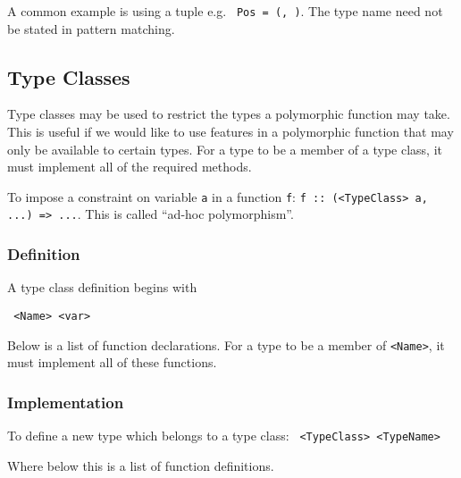 A common example is using a tuple e.g. \texttt{ Pos = (, )}. The type name need not be stated in pattern matching.

\subsection{Type Classes}
Type classes may be used to restrict the types a polymorphic function may take. This is useful if we would like to use features in a polymorphic function that may only be available to certain types. For a type to be a member of a type class, it must implement all of the required methods.

To impose a constraint on variable \texttt{a} in a function \texttt{f}: \texttt{f :: (\texttt<TypeClass> a, ...) => ...}. This is called ``ad-hoc polymorphism''.

\subsubsection{Definition}
A type class definition begins with

\texttt{ <Name> <var> }

Below is a list of function declarations. For a type to be a member of \texttt{<Name>}, it must implement all of these functions.

\subsubsection{Implementation}
To define a new type which belongs to a type class:
\texttt{ <TypeClass> <TypeName> }

Where below this is a list of function definitions.

